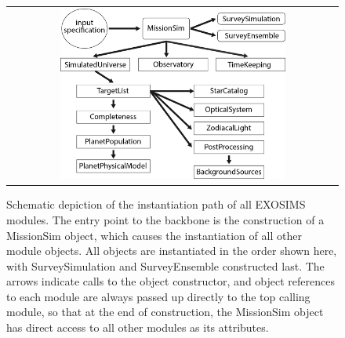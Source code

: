 \documentclass[cleanfoot]{asme2ej}
\begin{document}
\begin{figure}[ht]
    \begin{center}
        \begin{tabular}{c}
             \includegraphics[width=0.7\textwidth]{instantiation_tree1}
        \end{tabular}
    \end{center}
    \caption{Schematic depiction of the instantiation path of all EXOSIMS modules.  The entry point to the backbone is the construction of a MissionSim object, which causes the instantiation of all other module objects.  All objects are instantiated in the order shown here, with SurveySimulation and SurveyEnsemble constructed last.  The arrows indicate calls to the object constructor, and object references to each module are always passed up directly to the top calling module, so that at the end of construction, the MissionSim object has direct access to all other modules as its attributes.}
    \label{fig:instantiation_tree}
\end{figure}
\end{document}
